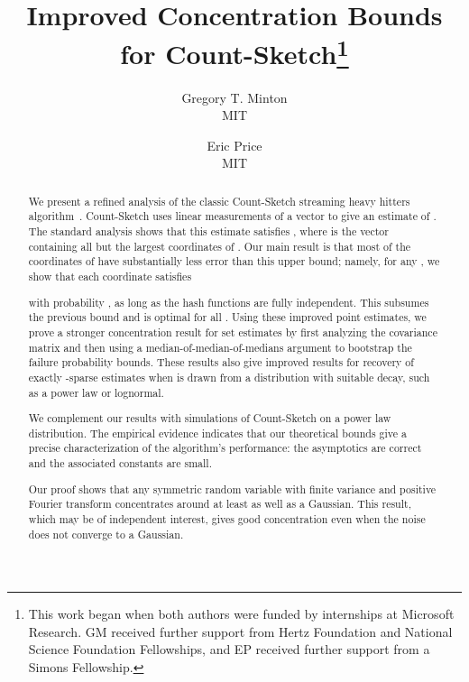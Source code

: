 \documentclass[letterpaper,11pt]{article}
\begin{document}
\begin{titlepage}
\title{Improved Concentration Bounds for
    Count-Sketch\thanks{This work began when both authors were funded by
      internships at Microsoft Research.  GM received further support
      from Hertz Foundation and National Science Foundation Fellowships,
      and EP received further support from a Simons Fellowship.}}

\date{}
\author{Gregory T. Minton\\MIT \and Eric Price\\MIT}
\maketitle


\begin{abstract}
  We present a refined analysis of the classic Count-Sketch streaming
  heavy hitters algorithm~\cite{CCF02}.  Count-Sketch uses  linear measurements of a vector  to give an estimate
   of .  The standard analysis shows that this estimate
   satisfies , where  is the vector
  containing all but the largest  coordinates of .  Our main
  result is that most of the coordinates of  have
  substantially less error than this upper bound; namely, for any , we show that each coordinate  satisfies

with probability , as long as the hash functions are
fully independent.  This subsumes the previous bound and is optimal
for all .  Using these improved point estimates, we prove a stronger
concentration result for set estimates by first analyzing the covariance
matrix and then using a median-of-median-of-medians argument to
bootstrap the failure probability bounds.  These results also give
improved results for  recovery of exactly -sparse estimates
 when  is drawn from a distribution with suitable decay, such
as a power law or lognormal.

We complement our results with simulations of Count-Sketch on a power
law distribution.  The empirical evidence indicates that our theoretical
bounds give a precise characterization of the algorithm's performance:
the asymptotics are correct and the associated constants are small.

Our proof shows that any symmetric random variable with finite variance
and positive Fourier transform concentrates around  at least as well as a
Gaussian.  This result, which may be of independent interest, gives good
concentration even when the noise does not converge to a Gaussian.
\end{abstract}

\thispagestyle{empty}
\end{titlepage}
\end{document}
